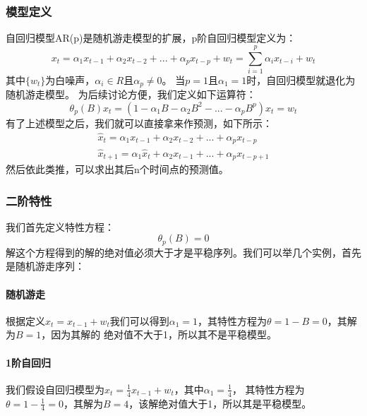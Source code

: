 \subsubsection{模型定义}
自回归模型AR(p)是随机游走模型的扩展，p阶自回归模型定义为：
\begin{equation}
x_{t}=\alpha _{1}x_{t-1} + \alpha _{2}x_{t-2} + ... + \alpha _{p}x_{t-p} + w_{t} = \sum_{i=1}^{p} \alpha _{i}x_{t-i} + w_{t}
\label{e000025}
\end{equation}
其中$\{ w_{t} \}$为白噪声，$\alpha _{i} \in R$且$\alpha_{p} \ne 0$。\newline
当$p=1$且$\alpha _{1}=1$时，自回归模型就退化为随机游走模型。\newline
为后续讨论方便，我们定义如下运算符：
\begin{equation}
\theta _{p}(B)x_{t}=(1-\alpha _{1}B-\alpha _{2}B^{2}-...-\alpha _{p}B^{p})x_{t}=w_{t}
\label{e000026}
\end{equation}
有了上述模型之后，我们就可以直接拿来作预测，如下所示：
\begin{equation}
\begin{aligned}
    \hat{x}_t=\alpha _{1}x_{t-1}+\alpha _{2}x_{t-2}+...+\alpha _{p}x_{t-p} \\
    \hat{x}_{t+1}=\alpha _{1}\hat{x}_{t}+\alpha _{2}x_{t-1}+...+\alpha _{p}x_{t-p+1}
\end{aligned}
\label{e000027}
\end{equation}
然后依此类推，可以求出其后n个时间点的预测值。
\subsubsection{二阶特性}
我们首先定义特性方程：
\begin{equation}
\theta _{p}(B)=0
\label{e000028}
\end{equation}
解这个方程得到的解的绝对值必须大于才是平稳序列。我们可以举几个实例，首先是随机游走序列：
\paragraph{随机游走}
根据定义$x_{t}=x_{t-1}+w_{t}$我们可以得到$\alpha _1=1$，其特性方程为$\theta=1-B=0$，其解为$B=1$，因为其解的
绝对值不大于1，所以其不是平稳模型。
\paragraph{1阶自回归}
我们假设自回归模型为$x_{t}=\frac{1}{4}x_{t-1}+w_{t}$，其中$\alpha _1=\frac{1}{4}$，
其特性方程为$\theta = 1-\frac{1}{4}=0$，其解为$B=4$，该解绝对值大于1，所以其是平稳模型。
